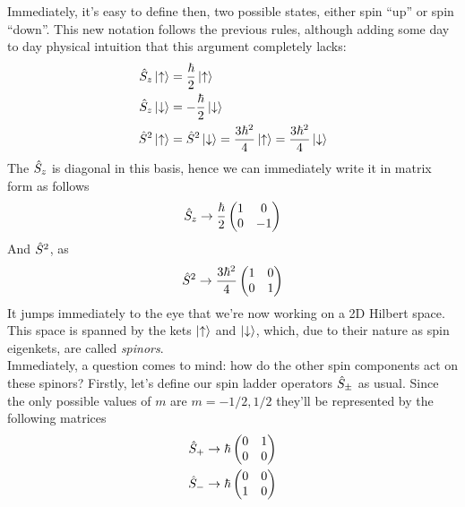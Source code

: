 \documentclass[../qm.tex]{subfiles}
\begin{document}
	Immediately, it's easy to define then, two possible states, either spin ``up'' or spin ``down''. This new notation follows the previous rules, although adding some day to day physical intuition that this argument completely lacks:
	\begin{equation}
		\begin{aligned}
			\hat{S}_z\ket{\uparrow}&=\frac{\hbar}{2}\ket{\uparrow}\\
			\hat{S}_z\ket{\downarrow}&=-\frac{\hbar}{2}\ket{\downarrow}\\
			\hat{S}^2\ket{\uparrow}&=\hat{S}^2\ket{\downarrow}=\frac{3\hbar^2}{4}\ket{\uparrow}=\frac{3\hbar^2}{4}\ket{\downarrow}
		\end{aligned}
		\label{eq:szupdown}
	\end{equation}
	The $\hat{S}_z$ is diagonal in this basis, hence we can immediately write it in matrix form as follows
	\begin{equation}
		\hat{S}_z\to\frac{\hbar}{2}\begin{pmatrix}
			1&0\\
			0&-1
		\end{pmatrix}
		\label{eq:sigmazetamatrix}
	\end{equation}
	And $\hat{S}^2$, as
	\begin{equation}
		\hat{S}^2\to\frac{3\hbar^2}{4}\begin{pmatrix}
			1&0\\
			0&1
		\end{pmatrix}
		\label{eq:ssqupdown}
	\end{equation}
	It jumps immediately to the eye that we're now working on a 2D Hilbert space. This space is spanned by the kets $\ket{\uparrow}$ and $\ket{\downarrow}$, which, due to their nature as spin eigenkets, are called \textit{spinors}.\\
	Immediately, a question comes to mind: how do the other spin components act on these spinors? Firstly, let's define our spin ladder operators $\hat{S}_{\pm}$ as usual. Since the only possible values of $m$ are $m=-1/2,1/2$ they'll be represented by the following matrices
	\begin{equation}
		\begin{aligned}
			\hat{S}_{+}&\to\hbar\begin{pmatrix}
				0&1\\
				0&0
			\end{pmatrix}\\
			\hat{S}_{-}&\to\hbar\begin{pmatrix}
				0&0\\
				1&0
			\end{pmatrix}
		\end{aligned}
		\label{eq:spsmmatrix}
	\end{equation}
\end{document}
